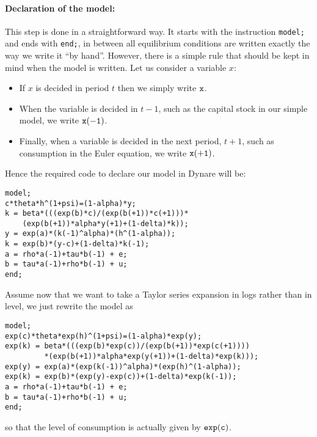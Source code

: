 \documentclass[11pt,a4paper]{article}
\begin{document}
\paragraph{Declaration of the model:}
This step is done in a straightforward way. It starts with the instruction {\tt model;} and ends with {\tt end;}, in between all equilibrium conditions are written exactly the way we write it ``by hand''. However, there is a simple rule that should be kept in mind when the model is written. Let us consider a variable $x$:
\begin{itemize}
\item If $x$ is decided in period $t$ then we simply write ${\tt x}$.
\item When the variable is decided in $t-1$, such as the capital stock in our simple model, we write ${\tt x(-1)}$. \item Finally, when a variable is decided in the next period, $t+1$, such as consumption in the Euler equation, we write ${\tt x(+1)}$.
\end{itemize}
Hence the required code to declare our model in {\sc Dynare} will be:
\begin{verbatim}
model;
c*theta*h^(1+psi)=(1-alpha)*y;
k = beta*(((exp(b)*c)/(exp(b(+1))*c(+1)))*
    (exp(b(+1))*alpha*y(+1)+(1-delta)*k));
y = exp(a)*(k(-1)^alpha)*(h^(1-alpha));
k = exp(b)*(y-c)+(1-delta)*k(-1);
a = rho*a(-1)+tau*b(-1) + e;
b = tau*a(-1)+rho*b(-1) + u;
end;
\end{verbatim}
Assume now that we want to take a Taylor series expansion in logs rather than in level, we just rewrite the model as
\begin{verbatim}
model;
exp(c)*theta*exp(h)^(1+psi)=(1-alpha)*exp(y);
exp(k) = beta*(((exp(b)*exp(c))/(exp(b(+1))*exp(c(+1))))
         *(exp(b(+1))*alpha*exp(y(+1))+(1-delta)*exp(k)));
exp(y) = exp(a)*(exp(k(-1))^alpha)*(exp(h)^(1-alpha));
exp(k) = exp(b)*(exp(y)-exp(c))+(1-delta)*exp(k(-1));
a = rho*a(-1)+tau*b(-1) + e;
b = tau*a(-1)+rho*b(-1) + u;
end;
\end{verbatim}
so that the level of consumption is actually given by ${\tt exp(c)}$.
\end{document}
